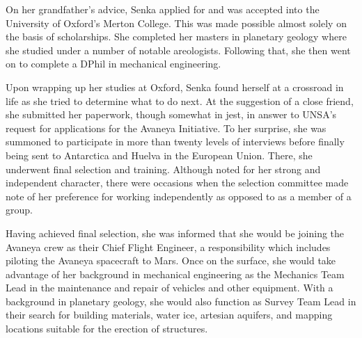On her grandfather's advice, Senka applied for and was accepted into the University of Oxford's Merton College. This was made possible almost solely on the basis of scholarships. She completed her masters in planetary geology where she studied under a number of notable areologists. Following that, she then went on to complete a DPhil in mechanical engineering.

Upon wrapping up her studies at Oxford, Senka found herself at a crossroad in life as she tried to determine what to do next. At the suggestion of a close friend, she submitted her paperwork, though somewhat in jest, in answer to UNSA's request for applications for the Avaneya Initiative. To her surprise, she was summoned to participate in more than twenty levels of interviews before finally being sent to Antarctica and Huelva in the European Union. There, she underwent final selection and training. Although noted for her strong and independent character, there were occasions when the selection committee made note of her preference for working independently as opposed to as a member of a group.

Having achieved final selection, she was informed that she would be joining the Avaneya crew as their Chief Flight Engineer, a responsibility which includes piloting the Avaneya spacecraft to Mars. Once on the surface, she would take advantage of her background in mechanical engineering as the Mechanics Team Lead in the maintenance and repair of vehicles and other equipment. With a background in planetary geology, she would also function as Survey Team Lead in their search for building materials, water ice, artesian aquifers, and mapping locations suitable for the erection of structures.

